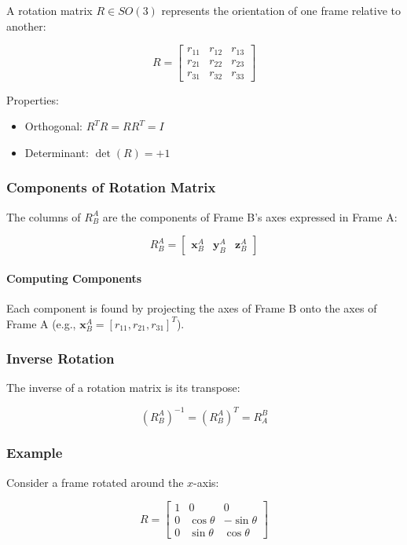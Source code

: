\documentclass{article}
\begin{document}
A rotation matrix $R \in SO(3)$ represents the orientation of one frame relative to another:

$$
R = \begin{bmatrix}
r_{11} & r_{12} & r_{13} \\
r_{21} & r_{22} & r_{23} \\
r_{31} & r_{32} & r_{33}
\end{bmatrix}
$$

Properties:

\begin{itemize}
    \item Orthogonal: $R^T R = RR^T = I$
    \item Determinant: $\det(R) = +1$
\end{itemize}

\subsubsection{Components of Rotation Matrix}

The columns of $R^A_B$ are the components of Frame B's axes expressed in Frame A:

$$
R^A_B = \begin{bmatrix}
\mathbf{x}_B^A & \mathbf{y}_B^A & \mathbf{z}_B^A
\end{bmatrix}
$$

\paragraph{Computing Components}

Each component is found by projecting the axes of Frame B onto the axes of Frame A (e.g., $\mathbf{x}_B^A = [r_{11}, r_{21}, r_{31}]^T$).

\subsubsection{Inverse Rotation}

The inverse of a rotation matrix is its transpose:

$$
(R^A_B)^{-1} = (R^A_B)^T = R^B_A
$$

\subsubsection{Example}

Consider a frame rotated around the $x$-axis:

$$
R = \begin{bmatrix}
1 & 0 & 0 \\
0 & \cos\theta & -\sin\theta \\
0 & \sin\theta & \cos\theta
\end{bmatrix}
$$
\end{document}
